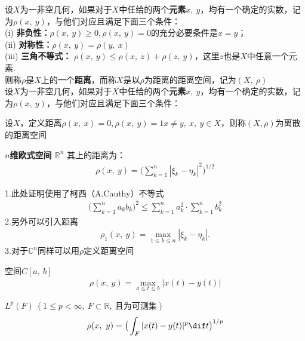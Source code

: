\begin{newdef}
    设$X$为一非空几何，如果对于$X$中任给的两个\textbf{元素}$x,\ y$，均有一个确定的实数，记为$\rho\left( x, \ y \right)$，与他们对应且满足下面三个条件：\\
    (i) \textbf{非负性：}$\rho (x,\ y)\geqslant 0, \rho (x,\ y)=0 $的充分必要条件是$x=y$；\\
    (ii) \textbf{对称性：}$\rho (x,\ y)=\rho (y, \ x)$\\
    (iii) \textbf{三角不等式：} $\rho (x,\ y)\leqslant \rho (x,\ z)+\rho (z, \ y)$，这里$z$也是$X$中任意一个元素.\\
则称$\rho $是$X$上的一个\textbf{距离}，而称$X$是以$\rho$为距离的距离空间，记为$(X, \ \rho)$\\
设$X$为一非空几何，如果对于$X$中任给的两个\textbf{元素}$x,\ y$，均有一个确定的实数，记为$\rho\left( x, \ y \right)$，与他们对应且满足下面三个条件：
\end{newdef}

\begin{note}
 设$X$，定义距离$\rho(x, \ x )=0, \rho(x, \ y)=1 x\neq y, \ x, \ y \in X$，则称$(X,\rho)$为离散的距离空间
\end{note}


\begin{newex}
     \textbf{$n$维欧式空间 $\mathbb R ^n$}
    其上的距离为：
    \begin{align}
        \rho (x, \ y)=\big( \sum\limits_{k=1}^n | \xi_k- \eta_k|^2 \big)^{1/2}
    \end{align}
\end{newex}

\begin{note}
   1.此处证明使用了柯西（A.Cauthy）不等式
    \begin{align}
    \big(\sum \limits_{k=1}^n a_k b_k \big)^2 \leqslant \sum \limits_{k=1}^n a_k^2 \cdot \sum \limits_{k=1}^n b_k^2 
    \end{align}
   2.另外可以引入距离
    \begin{align*}
        \rho_1(x,\ y)=\max \limits_{1\leqslant k \leqslant n}|\xi_k-\eta_k|. \tag*{(1')}
    \end{align*}
   3.对于$\mathbb C^n$同样可以用$\rho$定义距离空间
\end{note}

\begin{newex}
    空间$C[a,\ b]$\ 
    \begin{align}
        \rho(x, \ y)=\max\limits_{a \leqslant t \leqslant b} |x(t)-y(t)|
    \end{align}
\end{newex}

\begin{newex}
    $L^p(F) \ (1 \leqslant p < \infty , \ F \subset \mathbb R ,\ \mbox{且为可测集})$
    \begin{align}
         \rho (x,\ y)= \big( \int _{F} |x(t)-y(t)|^p \dif t \big)^{1/p}
    \end{align} 
    
\end{newex}
\begin{note}
  
\end{note}
